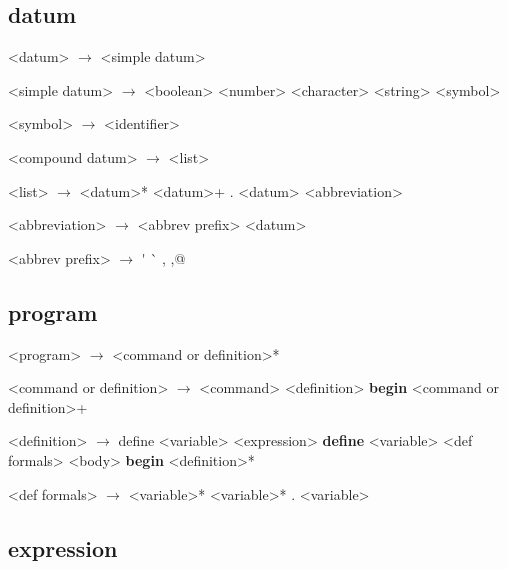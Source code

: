 \documentclass[11pt]{report}
\begin{document}
\setlength{\grammarindent}{3em}
\subsection{datum}

\begin{grammar}
  <datum> $\longrightarrow$ <simple datum> 

  <simple datum> $\longrightarrow$ <boolean> \alt <number>
  \alt <character> \alt <string> \alt <symbol>

  <symbol> $\longrightarrow$ <identifier>

  <compound datum> $\longrightarrow$ <list>

  <list> $\longrightarrow$ \bop <datum>* \bcp \alt \bop <datum>+  .  <datum> \bcp
  \alt <abbreviation>

  <abbreviation> $\longrightarrow$ <abbrev prefix> <datum>

  <abbrev prefix> $\longrightarrow$ \'{} \alt \`{} \alt , \alt ,@
  
\end{grammar}

\subsection{program}

\begin{grammar}
  <program> $\longrightarrow$ <command or definition>*
  
  <command or definition> $\longrightarrow$ <command>
  \alt <definition>
  \alt \bop \textbf{begin} <command or definition>+ \bcp

  <definition> $\longrightarrow$ \bop define <variable> <expression> \bcp
  \alt \bop \textbf{define} \bop <variable> <def formals> \bcp <body> \bcp
  \alt \bop \textbf{begin} <definition>* \bcp

  <def formals> $\longrightarrow$ <variable>*
  \alt <variable>*  .  <variable>
\end{grammar}

\subsection{expression}
\end{document}
